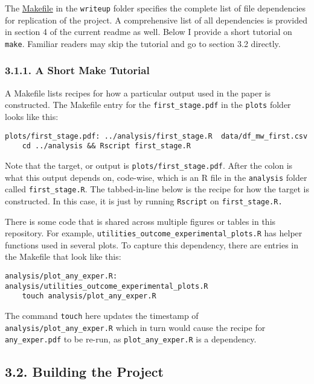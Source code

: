 \documentclass[10pt]{article}
\begin{document}
The \href{https://www.github.com/johnjosephhorton/minimum_wage/blob/main/writeup/Makefile}{Makefile} in the \texttt{writeup} folder specifies the complete list of file dependencies for replication of the project. 
A comprehensive list of all dependencies is provided in section 4 of the current readme as well.
Below I provide a short tutorial on \texttt{make}. 
Familiar readers may skip the tutorial and go to section 3.2 directly.

\subsubsection*{3.1.1. A Short Make Tutorial}
A Makefile lists recipes for how a particular output used in the paper is constructed.
The Makefile entry for the \texttt{first\_stage.pdf} in the \texttt{plots} folder looks like this: 

\begin{verbatim}
plots/first_stage.pdf: ../analysis/first_stage.R  data/df_mw_first.csv
	cd ../analysis && Rscript first_stage.R
\end{verbatim}

Note that the target, or output is \texttt{plots/first\_stage.pdf}.  
After the colon is what this output depends on, code-wise, which is an R file in the \texttt{analysis} folder called \texttt{first\_stage.R}.
The tabbed-in-line below is the recipe for how the target is constructed. 
In this case, it is just by running \texttt{Rscript} on \texttt{first\_stage.R.}

There is some code that is shared across multiple figures or tables in this repository. 
For example, \texttt{utilities\_outcome\_experimental\_plots.R} has helper functions used in several plots.
To capture this dependency, there are entries in the Makefile that look like this: 

\begin{verbatim}
analysis/plot_any_exper.R: analysis/utilities_outcome_experimental_plots.R
	touch analysis/plot_any_exper.R
\end{verbatim}

The command \texttt{touch} here updates the timestamp of \texttt{analysis/plot\_any\_exper.R} which in turn would cause the recipe for \texttt{any\_exper.pdf} to be re-run, as \texttt{plot\_any\_exper.R} is a dependency.

\subsection*{3.2. Building the Project}
\end{document}
